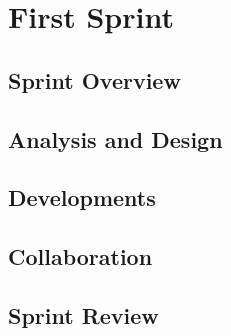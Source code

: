 \chapter{First Sprint}

\section{Sprint Overview}


\section{Analysis and Design}




\section{Developments}





\section{Collaboration}


\section{Sprint Review}
